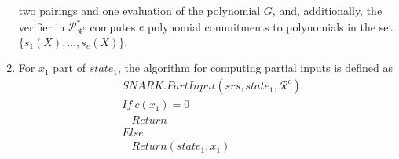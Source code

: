 \begin{lemma}
\begin{enumerate}
two pairings and one evaluation of the polynomial $G$, and, additionally, the verifier in $\mathscr{P}^*_{\mathcal{R}^c}$ computes $e$ 
polynomial commitments to polynomials in the set $\{s_1(X), \ldots, s_e(X)\}$. 
\item For $x_1$ part of  $\mathit{state_1}$, the algorithm for computing partial inputs is defined as 
\begin{align*}
&\mathit{SNARK.PartInput}(\mathit{srs}, \mathit{state_1}, \mathcal{R}^c) \\
&\mathit{If \ } c(x_1) = 0 \\
&\ \ \ \ \mathit{Return} \\
&\mathit{Else } \\
&\ \ \ \ \mathit{Return} (\mathit{state_1}, x_1)
\end{align*}
\end{enumerate}
\end{lemma}